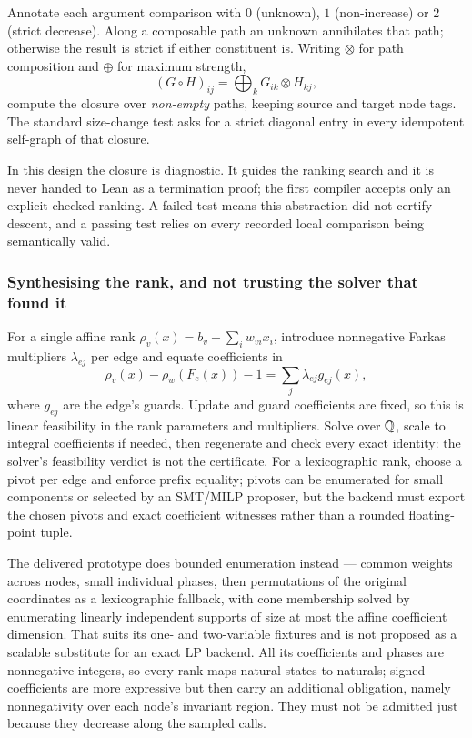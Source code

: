 Annotate each argument comparison with $0$ (unknown), $1$ (non-increase) or $2$
(strict decrease). Along a composable path an unknown annihilates that path;
otherwise the result is strict if either constituent is. Writing $\otimes$ for
path composition and $\oplus$ for maximum strength,
\[
 (G\circ H)_{ij}=\bigoplus_k G_{ik}\otimes H_{kj},
\]
compute the closure over \emph{non-empty} paths, keeping source and target node
tags. The standard size-change test asks for a strict diagonal entry in every
idempotent self-graph of that closure.

In this design the closure is diagnostic. It guides the ranking search and it is
never handed to Lean as a termination proof; the first compiler accepts only an
explicit checked ranking. A failed test means this abstraction did not certify
descent, and a passing test relies on every recorded local comparison being
semantically valid.

\subsubsection*{Synthesising the rank, and not trusting the solver that found it}

For a single affine rank $\rho_v(x)=b_v+\sum_i w_{vi}x_i$, introduce nonnegative
Farkas multipliers $\lambda_{ej}$ per edge and equate coefficients in
\[
 \rho_v(x)-\rho_w(F_e(x))-1=\sum_j\lambda_{ej}g_{ej}(x),
\]
where $g_{ej}$ are the edge's guards. Update and guard coefficients are fixed,
so this is linear feasibility in the rank parameters and multipliers. Solve over
$\mathbb{Q}$, scale to integral coefficients if needed, then regenerate and check every
exact identity: the solver's feasibility verdict is not the certificate. For a
lexicographic rank, choose a pivot per edge and enforce prefix equality; pivots
can be enumerated for small components or selected by an SMT/MILP proposer, but
the backend must export the chosen pivots and exact coefficient witnesses rather
than a rounded floating-point tuple.

The delivered prototype does bounded enumeration instead --- common weights
across nodes, small individual phases, then permutations of the original
coordinates as a lexicographic fallback, with cone membership solved by
enumerating linearly independent supports of size at most the affine coefficient
dimension. That suits its one- and two-variable fixtures and is not proposed as
a scalable substitute for an exact LP backend. All its coefficients and phases
are nonnegative integers, so every rank maps natural states to naturals; signed
coefficients are more expressive but then carry an additional obligation, namely
nonnegativity over each node's invariant region. They must not be admitted just
because they decrease along the sampled calls.

